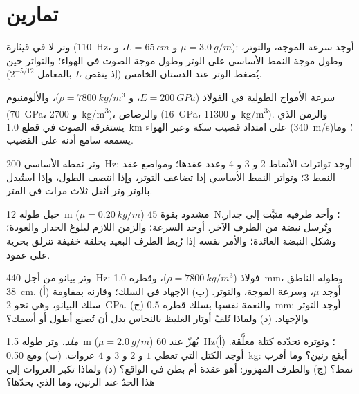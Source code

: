 \section{تمارين}

\begin{exercise}[$\star$]\label{exo:b2:waves-on-strings:1}
وتر لا في قيثارة (\qty{110}{Hz}، و $L = \qty{65}{cm}$، و $\mu = \qty{3.0}{g/m}$):
أوجد سرعة الموجة، والتوتر، وطول موجة النمط الأساسي على الوتر
وطول موجة الصوت في الهواء؛ والتواتر حين يُضغط الوتر عند الدستان
الخامس (إذ ينقص $L$ بالمعامل $2^{-5/12}$).
\end{exercise}

\begin{exercise}[$\star$]\label{exo:b2:waves-on-strings:2}
سرعة الأمواج الطولية في الفولاذ ($E = \qty{200}{GPa}$، و $\rho =
\qty{7800}{kg/m^3}$)، والألومنيوم (\qty{70}{GPa}، و \qty{2700}{kg/m^3})، والرصاص
(\qty{16}{GPa}، و \qty{11300}{kg/m^3}). والزمن الذي يستغرقه الصوت في قطع \qty{1.0}{km}
على امتداد قضيب سكة وعبر الهواء (\qty{340}{m/s})؛ وما يسمعه سامع أذنه
على القضيب.
\end{exercise}

\begin{exercise}[$\star$]\label{exo:b2:waves-on-strings:3}
وتر نمطه الأساسي \qty{200}{Hz}: أوجد تواترات الأنماط 2 و 3 و 4 وعدد
عقدها؛ ومواضع عقد النمط 3؛ وتواتر
النمط الأساسي إذا تضاعف التوتر، وإذا انتصف الطول، وإذا
استُبدل بالوتر وتر أثقل ثلاث مرات في المتر.
\end{exercise}

\begin{exercise}[$\star$]\label{exo:b2:waves-on-strings:4}
حبل طوله \qty{12}{m} ($\mu = \qty{0.20}{kg/m}$) مشدود بقوة \qty{45}{N}؛ وأحد
طرفيه مثبَّت إلى جدار. وتُرسل نبضة من الطرف الآخر. أوجد السرعة؛
والزمن اللازم لبلوغ الجدار والعودة؛ وشكل النبضة العائدة؛
والأمر نفسه إذا رُبط الطرف البعيد بحلقة خفيفة تنزلق بحرية على
عمود.
\end{exercise}

\begin{exercise}[$\star\star$]\label{exo:b2:waves-on-strings:5}
وتر بيانو من أجل \qty{440}{Hz}: فولاذ ($\rho = \qty{7800}{kg/m^3}$)،
وقطره \qty{1.0}{mm}، وطوله الناطق \qty{38}{cm}. (أ) أوجد $\mu$، وسرعة الموجة،
والتوتر. (ب) الإجهاد في السلك؛ وقارنه بمقاومة سلك
البيانو، وهي نحو \qty{2}{GPa}. (ج) والنغمة نفسها بسلك قطره \qty{0.5}{mm}: أوجد التوتر
والإجهاد. (د) ولماذا تُلفّ أوتار الغليظ بالنحاس بدل أن تُصنع
أطول أو أسمك؟
\end{exercise}

\begin{exercise}[$\star\star$]\label{exo:b2:waves-on-strings:6}
\emph{ملد.} وتر طوله \qty{1.5}{m} ($\mu = \qty{2.0}{g/m}$) يُهزّ عند
\qty{60}{Hz}؛ وتوتره تحدّده كتلة معلَّقة. (أ) أوجد الكتل التي تعطي
$1$ و $2$ و $3$ و $4$ عروات. (ب) ومع \qty{0.50}{kg}: أيقع رنين؟
وما أقرب نمط؟ (ج) والطرف المهزوز: أهو عقدة أم بطن في الواقع؟
(د) ولماذا تكبر العروات إلى هذا الحدّ عند الرنين، وما الذي يحدّها؟
\end{exercise}

